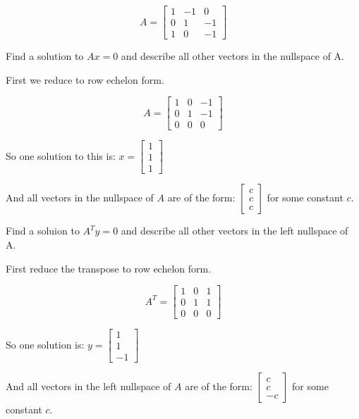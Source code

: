 \documentclass[12pt,letterpaper]{article}
\begin{document}
      \[
        A =
        \begin{bmatrix}
          1 & -1 & 0 \\
          0 & 1 & -1 \\
          1 & 0 & -1
        \end{bmatrix}
      \]

      Find a solution to $Ax = 0$ and describe all other vectors in the nullspace of A.

      First we reduce to row echelon form.

      \[
        A =
        \begin{bmatrix}
          1 & 0 & -1 \\
          0 & 1 & -1 \\
          0 & 0 & 0
        \end{bmatrix}
      \]

      So one solution to this is: $x = \begin{bmatrix}1 \\ 1 \\ 1\end{bmatrix}$

      And all vectors in the nullspace of $A$ are of the form:
      $\begin{bmatrix}c \\ c \\ c\end{bmatrix}$ for some constant $c$.

      Find a soluion to $A^Ty = 0$ and describe all other vectors in the left nullspace of A.

      First reduce the transpose to row echelon form.

      \[
        A^T =
        \begin{bmatrix}
          1 & 0 & 1 \\
          0 & 1 & 1 \\
          0 & 0 & 0
        \end{bmatrix}
      \]

      So one solution is: $y = \begin{bmatrix}1 \\ 1 \\ -1\end{bmatrix}$

      And all vectors in the left nullspace of $A$ are of the form:
      $\begin{bmatrix}c \\ c \\ -c\end{bmatrix}$ for some constant $c$.
\end{document}
